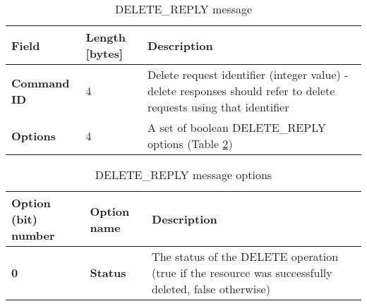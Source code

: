 \begin{table}[H]
\scriptsize
\begin{center}
\begin{tabular}{p{3cm} p{2cm} p{9.5cm}}
	\hline
	\textbf{Field}						& \textbf{Length} [bytes]				& \textbf{Description}				\\[1mm]
    \hline
	\textbf{Command ID}					& 4										& Delete request identifier (integer value) - delete responses should refer to delete requests using that identifier					\\[1.5mm]
    \textbf{Options}					& 4										& A set of boolean DELETE\_REPLY options (Table \ref{tab:mDeleteReplyOptions})					\\[1.5mm]
    \hline
\end{tabular}
\end{center}
\caption{DELETE\_REPLY message}
\label{tab:mDeleteReply}
\end{table}

\begin{table}[H]
\scriptsize
\begin{center}
\begin{tabular}{p{3cm} p{2cm} p{9.5cm}}
	\hline
	\textbf{Option (bit) number}			& \textbf{Option name}					& \textbf{Description}				\\[1mm]
    \hline
	\textbf{0}								& \textbf{Status}						& The status of the DELETE operation (true if the resource was successfully deleted, false otherwise)						\\[1.5mm]
    \hline
\end{tabular}
\end{center}
\caption{DELETE\_REPLY message options}
\label{tab:mDeleteReplyOptions}
\end{table}









